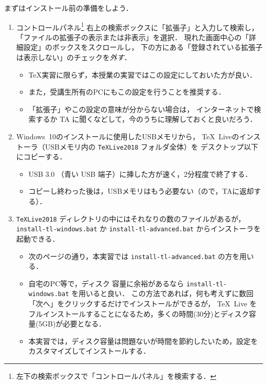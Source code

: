 \documentclass{ltjsarticle}
\begin{document}
まずはインストール前の準備をしよう．

\begin{enumerate}
  \itemsep\medskipamount
  \setcounter{enumi}{-1}
\item コントロールパネル\footnote{左下の検索ボックスで「コントロールパネル」を検索する．}
  右上の検索ボックスに「拡張子」と入力して検索し，
  「ファイルの拡張子の表示または非表示」を選択．
  現れた画面中心の「詳細設定」のボックスをスクロールし，
  下の方にある「登録されている拡張子は表示しない」のチェックを\emph{外す}．
  \begin{itemize}
  \item \TeX 実習に限らず，本授業の実習ではこの設定にしておいた方が良い．
  \item また，受講生所有のPCにもこの設定を行うことを推奨する．
  \item 「拡張子」やこの設定の意味が分からない場合は，
    インターネットで検索するか TA に聞くなどして，今のうちに理解しておくと良いだろう．
  \end{itemize}
\item Windows~10のインストールに使用したUSBメモリから，
  \TeX~Liveのインストーラ（USBメモリ内の \texttt{TeXLive2018} フォルダ全体）を
  デスクトップ以下にコピーする．
  \begin{itemize}
  \item USB 3.0 （青い USB 端子）に挿した方が速く，2分程度で終了する．
  \item コピーし終わった後は，USBメモリはもう必要ない（ので，TAに返却する）．
  \end{itemize}
\item \texttt{TeXLive2018}
  ディレクトリの中にはそれなりの数のファイルがあるが，\texttt{install-tl-windows.bat}
  か \texttt{install-tl-advanced.bat} からインストーラを起動できる．
  \begin{itemize}
  \item 次のページの通り，本実習では \texttt{install-tl-advanced.bat} の方を用いる．
  \item 自宅のPC等で，ディスク
    容量に余裕があるなら \texttt{install-tl-windows.bat} を用いると良い．
    この方法であれば，何も考えずに数回「次へ」をクリックするだけでインストールができるが，
    \TeX~Live をフルインストールすることになるため，多くの時間(30分)とディスク容量(5GB)が必要となる．
  \item 本実習では，ディスク容量は問題ないが時間を節約したいため，設定をカスタマイズしてインストールする．
  \end{itemize}
\end{enumerate}
\end{document}
